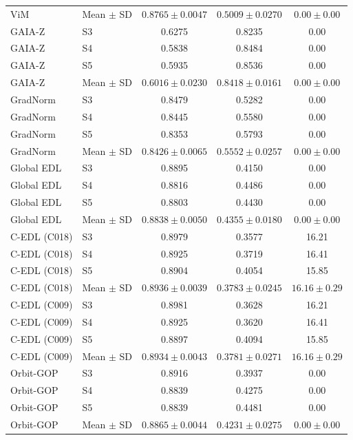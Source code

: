 \begin{longtable}{@{}llccc@{}}
ViM & Mean $\pm$ SD & $0.8765 \pm 0.0047$ & $0.5009 \pm 0.0270$ & $0.00 \pm 0.00$ \\
GAIA-Z & S3 & 0.6275 & 0.8235 & 0.00 \\
GAIA-Z & S4 & 0.5838 & 0.8484 & 0.00 \\
GAIA-Z & S5 & 0.5935 & 0.8536 & 0.00 \\
GAIA-Z & Mean $\pm$ SD & $0.6016 \pm 0.0230$ & $0.8418 \pm 0.0161$ & $0.00 \pm 0.00$ \\
GradNorm & S3 & 0.8479 & 0.5282 & 0.00 \\
GradNorm & S4 & 0.8445 & 0.5580 & 0.00 \\
GradNorm & S5 & 0.8353 & 0.5793 & 0.00 \\
GradNorm & Mean $\pm$ SD & $0.8426 \pm 0.0065$ & $0.5552 \pm 0.0257$ & $0.00 \pm 0.00$ \\
Global EDL & S3 & 0.8895 & 0.4150 & 0.00 \\
Global EDL & S4 & 0.8816 & 0.4486 & 0.00 \\
Global EDL & S5 & 0.8803 & 0.4430 & 0.00 \\
Global EDL & Mean $\pm$ SD & $0.8838 \pm 0.0050$ & $0.4355 \pm 0.0180$ & $0.00 \pm 0.00$ \\
C-EDL (C018) & S3 & 0.8979 & 0.3577 & 16.21 \\
C-EDL (C018) & S4 & 0.8925 & 0.3719 & 16.41 \\
C-EDL (C018) & S5 & 0.8904 & 0.4054 & 15.85 \\
C-EDL (C018) & Mean $\pm$ SD & $0.8936 \pm 0.0039$ & $0.3783 \pm 0.0245$ & $16.16 \pm 0.29$ \\
C-EDL (C009) & S3 & 0.8981 & 0.3628 & 16.21 \\
C-EDL (C009) & S4 & 0.8925 & 0.3620 & 16.41 \\
C-EDL (C009) & S5 & 0.8897 & 0.4094 & 15.85 \\
C-EDL (C009) & Mean $\pm$ SD & $0.8934 \pm 0.0043$ & $0.3781 \pm 0.0271$ & $16.16 \pm 0.29$ \\
Orbit-GOP & S3 & 0.8916 & 0.3937 & 0.00 \\
Orbit-GOP & S4 & 0.8839 & 0.4275 & 0.00 \\
Orbit-GOP & S5 & 0.8839 & 0.4481 & 0.00 \\
Orbit-GOP & Mean $\pm$ SD & $0.8865 \pm 0.0044$ & $0.4231 \pm 0.0275$ & $0.00 \pm 0.00$ \\
\end{longtable}
\endgroup

\clearpage
